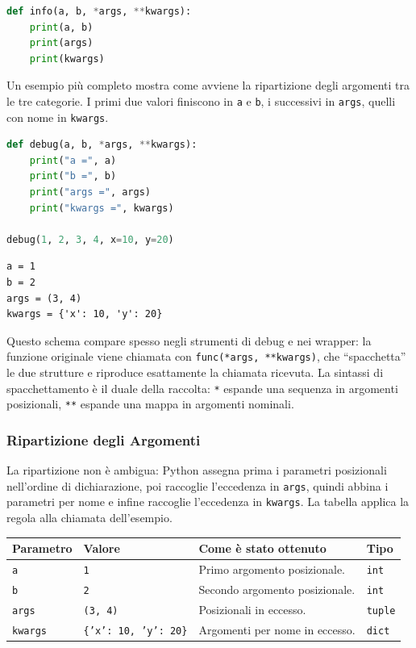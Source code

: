 \documentclass[12pt]{extarticle}
\begin{document}
\begin{lstlisting}[language=Python]
def info(a, b, *args, **kwargs):
    print(a, b)
    print(args)
    print(kwargs)
\end{lstlisting}

\noindent Un esempio più completo mostra come avviene la ripartizione degli argomenti tra le tre categorie. I primi due valori finiscono in \texttt{a} e \texttt{b}, i successivi in \texttt{args}, quelli con nome in \texttt{kwargs}.

\begin{lstlisting}[language=Python]
def debug(a, b, *args, **kwargs):
    print("a =", a)
    print("b =", b)
    print("args =", args)
    print("kwargs =", kwargs)

debug(1, 2, 3, 4, x=10, y=20)
\end{lstlisting}

\begin{lstlisting}[numbers=none]
a = 1
b = 2
args = (3, 4)
kwargs = {'x': 10, 'y': 20}
\end{lstlisting}

\noindent Questo schema compare spesso negli strumenti di debug e nei wrapper: la funzione originale viene chiamata con \texttt{func(*args, **kwargs)}, che ``spacchetta'' le due strutture e riproduce esattamente la chiamata ricevuta. La sintassi di spacchettamento è il duale della raccolta: \texttt{*} espande una sequenza in argomenti posizionali, \texttt{**} espande una mappa in argomenti nominali.

\subsubsection{Ripartizione degli Argomenti}

\noindent La ripartizione non è ambigua: Python assegna prima i parametri posizionali nell'ordine di dichiarazione, poi raccoglie l'eccedenza in \texttt{args}, quindi abbina i parametri per nome e infine raccoglie l'eccedenza in \texttt{kwargs}. La tabella applica la regola alla chiamata dell'esempio.

\begin{center}
\small
\begin{tabular}{p{3.0cm}p{3.6cm}p{6.0cm}p{2.2cm}}
    \toprule
    \textbf{Parametro} & \textbf{Valore} & \textbf{Come è stato ottenuto} & \textbf{Tipo} \\
    \midrule
    \texttt{a} & \texttt{1} & Primo argomento posizionale. & \texttt{int} \\
    \addlinespace
    \texttt{b} & \texttt{2} & Secondo argomento posizionale. & \texttt{int} \\
    \addlinespace
    \texttt{args} & \texttt{(3, 4)} & Posizionali in eccesso. & \texttt{tuple} \\
    \addlinespace
    \texttt{kwargs} & \texttt{\{'x': 10, 'y': 20\}} & Argomenti per nome in eccesso. & \texttt{dict} \\
    \bottomrule
\end{tabular}
\end{center}
\end{document}
